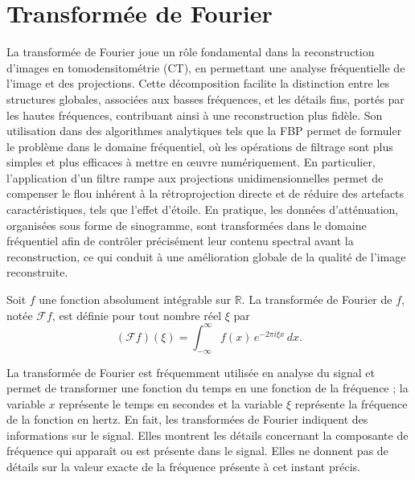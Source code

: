 \section{ Transformée de Fourier}
La transformée de Fourier joue un rôle fondamental dans la reconstruction d'images en tomodensitométrie (CT), en permettant une analyse fréquentielle de l'image et des projections. Cette décomposition facilite la distinction entre les structures globales, associées aux basses fréquences, et les détails fins, portés par les hautes fréquences, contribuant ainsi à une reconstruction plus fidèle. Son utilisation dans des algorithmes analytiques tels que la FBP permet de formuler le problème dans le domaine fréquentiel, où les opérations de filtrage sont plus simples et plus efficaces à mettre en œuvre numériquement. En particulier, l'application d'un filtre rampe aux projections unidimensionnelles permet de compenser le flou inhérent à la rétroprojection directe et de réduire des artefacts caractéristiques, tels que l'effet d'étoile. En pratique, les données d'atténuation, organisées sous forme de sinogramme, sont transformées dans le domaine fréquentiel afin de contrôler précisément leur contenu spectral avant la reconstruction, ce qui conduit à une amélioration globale de la qualité de l'image reconstruite.
\begin{definition}
    Soit \( f \) une fonction absolument intégrable sur \( \mathbb{R} \).
    La transformée de Fourier de \( f \), notée \( \mathcal{F}f \), est définie
    pour tout nombre réel \( \xi \) par
    \begin{equation}
    (\mathcal{F}f)(\xi)
    = \int_{-\infty}^{\infty} f(x)\, e^{-2\pi i \xi x}\, dx.
    \end{equation}
\end{definition}
La transformée de Fourier est fréquemment utilisée en analyse du signal et permet de transformer une fonction du temps en une fonction de la fréquence ; la variable $x$ représente le temps en secondes et la variable \( \xi \) représente la fréquence de la fonction en hertz. En fait, les transformées de Fourier indiquent des informations sur le signal. Elles montrent les détails concernant la composante de fréquence qui apparaît ou est présente
dans le signal. Elles ne donnent pas de détails sur la valeur exacte de la fréquence présente
à cet instant précis.


